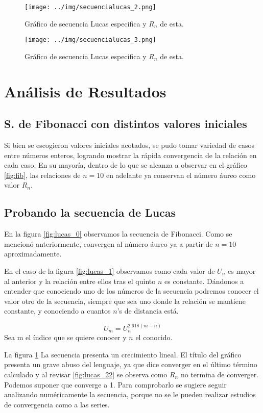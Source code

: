 \documentclass[../portafolio.tex]{subfiles}
\begin{document}
\begin{figure}
\centering
\texttt{[image: ../img/secuencialucas\_2.png]} 
\caption{Gráfico de secuencia Lucas especifica y $R_n$ de esta.}\label{fig:lucas_2}
\end{figure}

\begin{figure}
\centering
\texttt{[image: ../img/secuencialucas\_3.png]} 
\caption{Gráfico de secuencia Lucas especifica y $R_n$ de esta.}\label{fig:lucas_3}
\end{figure}


\section{Análisis de Resultados}

\subsection*{S. de Fibonacci con distintos valores iniciales}
Si bien se escogieron valores iniciales acotados, se pudo tomar variedad de casos entre números enteros, logrando mostrar la rápida convergencia de la relación en cada caso. En su mayoría, dentro de lo que se alcanza a observar en el gráfico \ref{fig:fib}, las relaciones de $n=10$ en adelante ya conservan el número áureo como valor $R_n$.

\subsection*{Probando la secuencia de Lucas}

En la figura \ref{fig:lucas_0} observamos la secuencia de Fibonacci. Como se mencionó anteriormente, convergen al número áureo ya a partir de $n=10$ aproximadamente.

En el caso de la figura \ref{fig:lucas_1} observamos como cada valor de $U_n$ es mayor al anterior y la relación entre ellos tras el quinto $n$ es constante. Dándonos a entender que conociendo uno de los números de la secuencia podremos conocer el valor otro de la secuencia, siempre que sea uno donde la relación se mantiene constante, y conociendo a cuantos $n$'s de distancia está. 

\begin{equation}
U_{m}=U_{n}^{2.618(m-n)}
\end{equation}
Sea m el índice que se quiere conocer y $n$ el conocido.

La figura \ref{fig:lucas_2} La secuencia presenta un crecimiento lineal. El título del gráfico presenta un grave abuso del lenguaje, ya que dice converger en el último término calculado y al revisar \ref{fig:lucas_22} se observa como $R_n$ no termina de converger. Podemos suponer que converge a 1. Para comprobarlo se sugiere seguir analizando numéricamente la secuencia, porque no se le pueden realizar estudios de convergencia como a las series.
\end{document}
